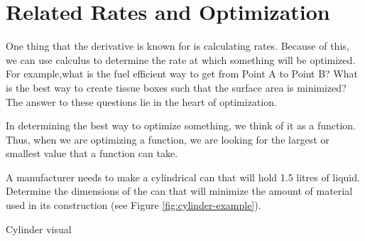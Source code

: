 \documentclass[working]{tuftebook}
\begin{document}
\chapter{Related Rates and Optimization}
\vspace{-2em}
One thing that the derivative is known for is calculating rates. Because of this, we can use calculus to determine the rate at which something will be optimized. For example,what is the fuel efficient way to get from Point A to Point B? What is the best way to create tissue boxes such that the surface area is minimized? The answer to these questions lie in the heart of optimization.  

\begin{definition}[Optimization]
    In determining the best way to optimize something, we think of it as a function. Thus, when we are optimizing a function, we are looking for the largest or smallest value that a function can take. 
\end{definition}
\begin{eg}
    A manufacturer needs to make a cylindrical can that will hold 1.5 litres of liquid. Determine the dimensions of the can that will minimize the amount of material used in its construction (see Figure \ref{fig:cylinder-example}).
\end{eg}
\begin{marginfigure}
    \centering
    \caption{Cylinder visual}
    \label{fig:cylinder-example}
\end{marginfigure}
    
\end{document}
